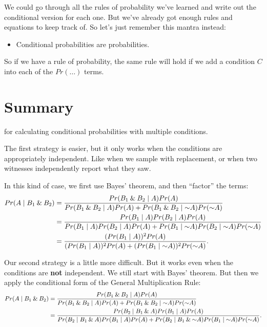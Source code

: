 \documentclass[justified]{tufte-book}
\newcommand{\given}{\mid}
\renewcommand{\neg}{\mathbin{\sim}}
\renewcommand{\wedge}{\mathbin{\&}}
\newcommand{\p}{Pr}
\newenvironment{info}{\begin{itemize}\item[\Info]}{\end{itemize}}
\theoremstyle{definition}
\theoremstyle{definition}
\theoremstyle{definition}
\theoremstyle{remark}
\begin{document}
We could go through all the rules of probability we've learned and write
out the conditional version for each one. But we've already got enough
rules and equations to keep track of. So let's just remember this mantra
instead:

\begin{info}
Conditional probabilities are probabilities.
\end{info}

So if we have a rule of probability, the same rule will hold if we add a
condition \(C\) into each of the \(\p(\ldots)\) terms.

\hypertarget{summary-2}{%
\section{Summary}\label{summary-2}}

 for calculating conditional
probabilities with multiple conditions.

The first strategy is easier, but it only works when the conditions are
appropriately independent. Like when we sample with replacement, or when
two witnesses independently report what they saw.

In this kind of case, we first use Bayes' theorem, and then ``factor''
the terms: \[
  \begin{aligned}
    \p(A \given B_1 \wedge B_2) &= 
      \frac{\p(B_1 \wedge B_2 \given A)\p(A)}{%
            \p(B_1 \wedge B_2 \given A)\p(A) +%
              \p(B_1 \wedge B_2 \given \neg A)\p(\neg A)}\\
      &= \frac{\p(B_1 \given A)\p(B_2 \given A)\p(A)}{%
                \p(B_1 \given A)\p(B_2 \given A)\p(A) +%
                  \p(B_1 \given \neg A)\p(B_2 \given \neg A)\p(\neg A)}\\
      &= \frac{(\p(B_1 \given A))^2\p(A)}{%
                (\p(B_1 \given A))^2\p(A) +%
                  (\p(B_1 \given \neg A))^2\p(\neg A)}.
  \end{aligned}
\]

Our second strategy is a little more difficult. But it works even when
the conditions are \textbf{not} independent. We still start with Bayes'
theorem. But then we apply the conditional form of the General
Multiplication Rule: \[
  \begin{aligned}
    \p(A \given B_1 \wedge B_2) &= 
      \frac{\p(B_1 \wedge B_2 \given A)\p(A)}{%
            \p(B_1 \wedge B_2 \given A)\p(A) +%
              \p(B_1 \wedge B_2 \given \neg A)\p(\neg A)}\\
      &= \frac{\p(B_2 \given B_1 \wedge A)\p(B_1 \given A)\p(A)}{%
                \p(B_2 \given B_1 \wedge A)\p(B_1 \given A)\p(A) +%
                  \p(B_2 \given B_1 \wedge \neg A)\p(B_1 \given \neg A)\p(\neg A)}.
  \end{aligned}
\]
\end{document}
